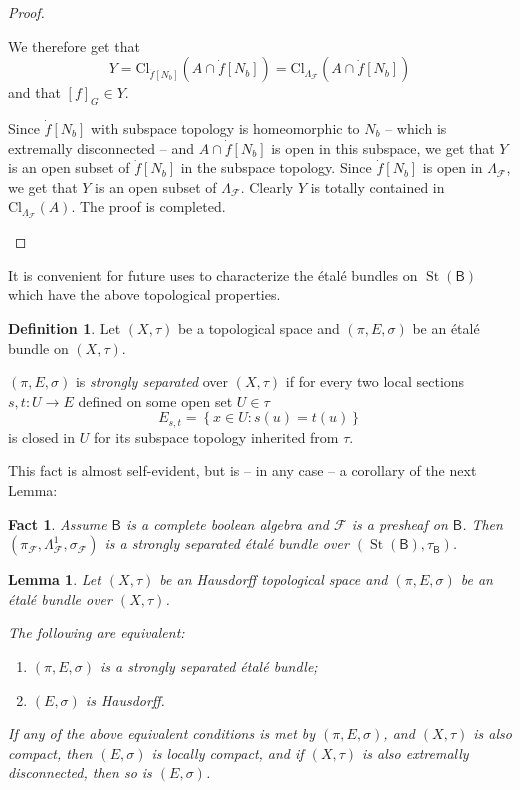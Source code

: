 \documentclass[11pt]{amsart}
\newcommand{\F}{\mathcal{F}}
\theoremstyle{plain}
\newtheorem{lemma}[theorem]{Lemma}
\newtheorem{fact}[theorem]{Fact}
\theoremstyle{definition}
\newtheorem{definition}[theorem]{Definition}
\theoremstyle{plain}
\theoremstyle{remark}
\DeclareMathOperator{\St}{St}
\newcommand{\bool}[1]{\mathsf{#1}}
\newcommand{\bp}[1]{\left\lbrace #1 \right\rbrace}
\newcommand{\0}{\mathsf{0}}
\renewcommand{\1}{\mathsf{1}}
\renewcommand{\2}{\mathsf{2}}
\theoremstyle{definition}
\begin{document}
\begin{proof}
\begin{description}
We therefore get that 
\[
Y=\mathrm{Cl}_{\dot{f}[N_b]}(A\cap \dot{f}[N_b])=\mathrm{Cl}_{\Lambda_\F}(A\cap \dot{f}[N_b])
\]
and that $[f]_G\in Y$.

Since $\dot{f}[N_b]$ with subspace topology is homeomorphic to $N_b$ -- which is extremally disconnected -- and $A\cap \dot{f}[N_b]$ is open in this subspace, we get that $Y$ is an open subset of $\dot{f}[N_b]$ in the subspace topology. Since $\dot{f}[N_b]$ is open in $\Lambda_\F$, we get that $Y$ is an open subset of $\Lambda_\F$. Clearly $Y$ is totally contained in $\mathrm{Cl}_{\Lambda_\F}(A)$. 
The proof is completed.
\end{description}
\end{proof}

It is convenient for future uses to characterize the \'etal\'e bundles on $\St(\bool{B})$ which have the above topological properties.

\begin{definition}\label{def:strsepetsp}
Let $(X,\tau)$ be a %
topological space and $(\pi,E,\sigma)$ be an \'etal\'e  bundle on $(X,\tau)$.

$(\pi,E,\sigma)$ is \emph{strongly separated} over $(X,\tau)$ if
for every two local sections $s,t:U\to E$ defined on some open set $U\in \tau$
\[
E_{s,t}=\bp{x\in U:s(u)=t(u)}
\] 
is closed in $U$ for its  subspace topology inherited from $\tau$.
\end{definition}


This fact is almost self-evident, but is -- in any case -- a corollary of the next Lemma:
\begin{fact}
Assume $\bool{B}$ is a complete boolean algebra and $\F$ is a presheaf on $\bool{B}$.
Then $(\pi_\F,\Lambda^1_\F,\sigma_\F)$ is a strongly separated \'etal\'e bundle over 
$(\St(\bool{B}),\tau_\bool{B})$.
\end{fact}



\begin{lemma}\label{lem:strsephauloccompextrdisc}
Let $(X,\tau)$ be an Hausdorff topological space and $(\pi,E,\sigma)$ be an \'etal\'e bundle over $(X,\tau)$.

The following are equivalent:
\begin{enumerate}
\item  \label{lem:strsephauloccompextrdisc-1}
$(\pi,E,\sigma)$ is a strongly separated \'etal\'e bundle;
\item \label{lem:strsephauloccompextrdisc-2}
$(E,\sigma)$ is Hausdorff.
\end{enumerate}
If any of the above equivalent conditions is met by $(\pi,E,\sigma)$, and $(X,\tau)$ is also compact, then $(E,\sigma)$ is locally compact, and if $(X,\tau)$ is also  extremally disconnected, then so is $(E,\sigma)$.
%
\end{lemma}
\end{document}
